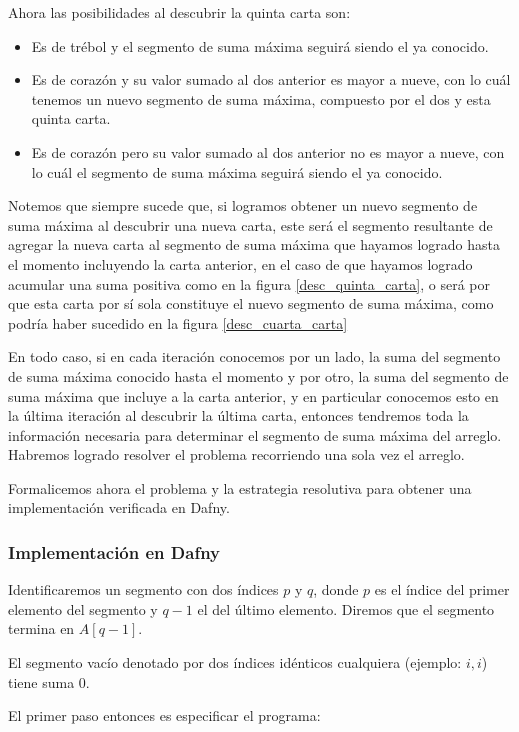 \documentclass[12pt, a4paper, openany, fleqn]{book}
\begin{document}
    Ahora las posibilidades al descubrir la quinta carta son:
    \begin{itemize}
        \item Es de trébol y el segmento de suma máxima seguirá siendo el ya conocido.
        \item Es de corazón y su valor sumado al dos anterior es mayor a nueve, con lo cuál tenemos un nuevo segmento de suma máxima, compuesto por el dos y esta quinta carta.
        \item Es de corazón pero su valor sumado al dos anterior no es mayor a nueve, con lo cuál el segmento de suma máxima seguirá siendo el ya conocido.
    \end{itemize}

    Notemos que siempre sucede que, si logramos obtener un nuevo segmento de suma máxima al descubrir una nueva carta, este será el segmento resultante de agregar la nueva carta al segmento de suma máxima que hayamos logrado hasta el momento incluyendo la carta anterior, en el caso de que hayamos logrado acumular una suma positiva como en la figura \ref{desc_quinta_carta}, o será por que esta carta por sí sola constituye el nuevo segmento de suma máxima, como podría haber sucedido en la figura \ref{desc_cuarta_carta}

    En todo caso, si en cada iteración conocemos por un lado, la suma del segmento de suma máxima conocido hasta el momento y por otro, la suma del segmento de suma máxima que incluye a la carta anterior, y en particular conocemos esto en la última iteración al descubrir la última carta, entonces tendremos toda la información necesaria para determinar el segmento de suma máxima del arreglo. Habremos logrado resolver el problema recorriendo una sola vez el arreglo.

    Formalicemos ahora el problema y la estrategia resolutiva para obtener una implementación verificada en Dafny.

    \subsubsection*{Implementación en Dafny}
    Identificaremos un segmento con dos índices $p$ y $q$, donde $p$ es el índice del primer elemento del segmento y $q-1$ el del último elemento. Diremos que el segmento termina en $A[q-1]$.

    El segmento vacío denotado por dos índices idénticos cualquiera (ejemplo: $i,i$) tiene suma 0.

    El primer paso entonces es especificar el programa:
\end{document}
